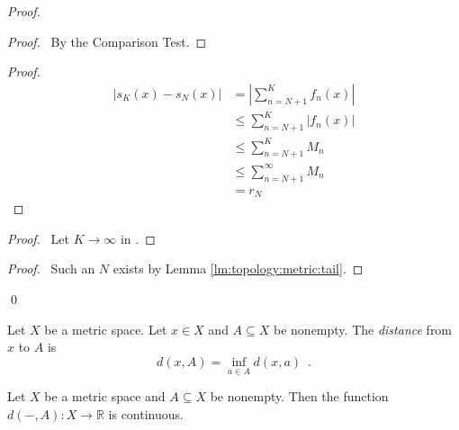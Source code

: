 \begin{proof}
  \pf
  \begin{proof}
    \pf\ By the Comparison Test.
  \end{proof}
  \begin{proof}
    \pf
    \begin{align*}
      |s_K(x) - s_N(x)| & = \left| \sum_{n = N+1}^K f_n(x) \right| \\
      & \leq \sum_{n=N+1}^K |f_n(x)| \\
      & \leq \sum_{n=N+1}^K M_n \\
      & \leq \sum_{n=N+1}^\infty M_n \\
      & = r_N
    \end{align*}
  \end{proof}
  \begin{proof}
    \pf\ Let $K \rightarrow \infty$ in .
  \end{proof}
  \begin{proof}
    \pf\ Such an $N$ exists by Lemma \ref{lm:topology:metric:tail}.
  \end{proof}
  \qed
\end{proof}

\begin{df}
  Let $X$ be a metric space. Let $x \in X$ and $A \subseteq X$ be nonempty.
  The     \emph{distance} from $x$ to $A$ is
  \[ d(x, A) = \inf_{a \in A} d(x, a) \enspace . \]
\end{df}

\begin{lm}
  \label{lm:topology:metric:dist_continuous}
  Let $X$ be a metric space and $A \subseteq X$ be nonempty. Then the
  function
  $d(-, A) : X \rightarrow \mathbb{R}$ is continuous.
\end{lm}

